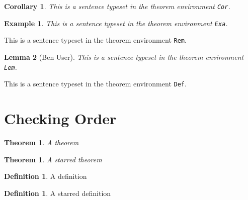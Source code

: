\documentclass{article}
\theoremstyle{break} \newtheorem{Cor}{Corollary}
\theoremstyle{plain} \newtheorem{Exa}{Example}[section]
\theoremstyle{marginbreak} \newtheorem{Lem}[Cor]{Lemma}
\theoremstyle{change}
\newtheorem{theorem}{Theorem}[section]
\newtheorem*{theorem*}{Theorem}
\theoremstyle{definition}
\newtheorem*{definition*}{Definition}
\newtheorem{definition}{Definition}[section]
\begin{document}
\begin{Cor}
This is a sentence typeset in the theorem environment \texttt{Cor}.
\end{Cor}

\begin{Exa}
This is a sentence typeset in the theorem environment \texttt{Exa}.
\end{Exa}

\begin{Rem}
This is a sentence typeset in the theorem environment \texttt{Rem}.
\end{Rem}

\begin{Lem}[Ben User]
This is a sentence typeset in the theorem environment \texttt{Lem}.
\end{Lem}

\begin{Def}
This is a sentence typeset in the theorem environment \texttt{Def}.
\end{Def}

\section{Checking Order}
\begin{theorem}
  A theorem
\end{theorem}
\begin{theorem*}
  A starred theorem
\end{theorem*}
\begin{definition}
  A definition
\end{definition}
\begin{definition*}
  A starred definition
\end{definition*}
\end{document}
